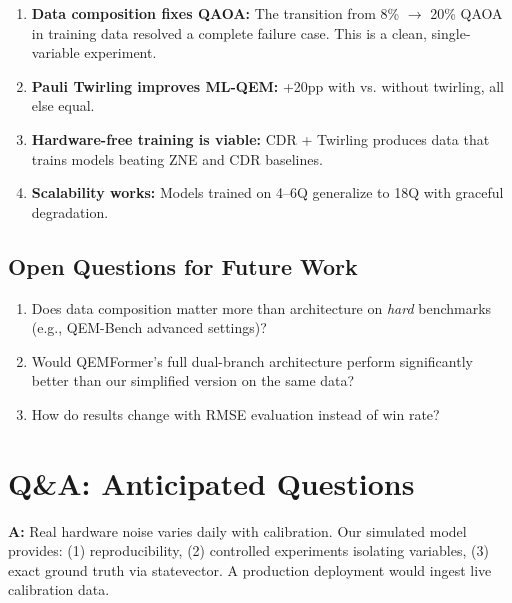 \documentclass[11pt, a4paper]{article}
\begin{document}
\begin{enumerate}
    \item \textbf{Data composition fixes QAOA:} The transition from
    8\% $\rightarrow$ 20\% QAOA in training data resolved a complete
    failure case. This is a clean, single-variable experiment.
    
    \item \textbf{Pauli Twirling improves ML-QEM:} +20pp with vs.
    without twirling, all else equal.
    
    \item \textbf{Hardware-free training is viable:} CDR + Twirling
    produces data that trains models beating ZNE and CDR baselines.
    
    \item \textbf{Scalability works:} Models trained on 4--6Q
    generalize to 18Q with graceful degradation.
\end{enumerate}

\subsection{Open Questions for Future Work}

\begin{enumerate}
    \item Does data composition matter more than architecture on
    \emph{hard} benchmarks (e.g., QEM-Bench advanced settings)?
    \item Would QEMFormer's full dual-branch architecture perform
    significantly better than our simplified version on the same data?
    \item How do results change with RMSE evaluation instead of
    win rate?
\end{enumerate}

\section{Q\&A: Anticipated Questions}
\label{sec:qa}

\begin{tcolorbox}[colback=gray!5!white, colframe=gray!75!black, title=Q1: Why not use real IBM hardware noise?]
\textbf{A:} Real hardware noise varies daily with calibration. Our simulated
model provides: (1) reproducibility, (2) controlled experiments isolating
variables, (3) exact ground truth via statevector. A production deployment
would ingest live calibration data.
\end{tcolorbox}
\end{document}
